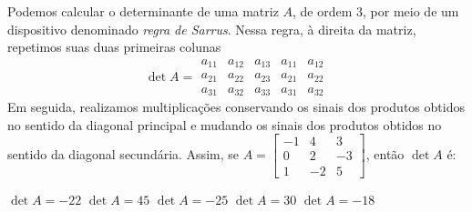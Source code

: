Podemos calcular o determinante de uma matriz $A$, de ordem $3$, por meio de um dispositivo denominado {\it regra de Sarrus}. Nessa regra, à direita da matriz, repetimos suas duas primeiras colunas
\[\det A = \begin{array}{|ccc|cc}
a_{11} &  a_{12}  &  a_{13}  &  a_{11}  &  a_{12}\\
a_{21} &  a_{22}  &  a_{23}  &  a_{21}  &  a_{22}\\
a_{31} &  a_{32}  &  a_{33}  &  a_{31}  &  a_{32}
\end{array} \]
Em seguida, realizamos multiplicações conservando os sinais dos produtos obtidos no sentido da diagonal principal e mudando os sinais dos produtos obtidos no sentido da diagonal secundária. Assim,
se $A = \left[ \begin{array}{ccc}
    -1  &   4  &   3\\
    0   &  2  &  -3\\
    1  &  -2  &   5
\end{array} \right]$, então $\det A$ é:

$\det A = -22$
$\det A = 45$
$\det A = -25$
$\det A = 30$
$\det A = -18$


